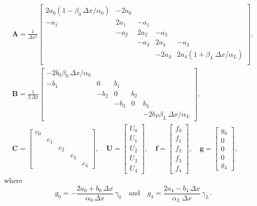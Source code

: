 \begin{gather*}
\boldsymbol{A}=\frac{1}{\Delta x^2}\begin{bmatrix}
2a_0(1-\beta_0\,\Delta x/\alpha_0)&-2a_0&    &    &    \\
-a_1&2a_1&-a_1&    &    \\
    &-a_2&2a_2&-a_2&    \\
    &    &-a_3&2a_3&-a_3\\
    &    &    &-2a_4&2a_4(1+\beta_L\,\Delta x/\alpha_L)\\
               \end{bmatrix},\\
\boldsymbol{B}=\frac{1}{2\,\Delta x}\begin{bmatrix}
-2b_0\beta_0\,\Delta x/\alpha_0&    &    &    &    \\
-b_1&   0& b_1&    &    \\
    &-b_2&   0& b_2&    \\
    &    &-b_3&   0& b_3\\
    &    &    &    &-2b_P\beta_L\,\Delta x/\alpha_L\end{bmatrix},\\
\boldsymbol{C}=\begin{bmatrix}
c_0&   &   &   &   \\
   &c_1&   &   &   \\
   &   &c_2&   &   \\
   &   &   &c_3&   \\
   &   &   &   &c_4
\end{bmatrix},\quad
\boldsymbol{U}=\begin{bmatrix} U_0\\ U_1\\ U_2\\ U_3\\ U_4\end{bmatrix},\quad
\boldsymbol{f}=\begin{bmatrix} f_0\\ f_1\\ f_2\\ f_3\\ f_4\end{bmatrix},\quad
\boldsymbol{g}=\begin{bmatrix} g_0\\ 0\\ 0\\ 0\\ g_4 \end{bmatrix},
\end{gather*}
where
\[
g_0=-\frac{2a_0+b_0\,\Delta x}{\alpha_0\,\Delta x}\,\gamma_0
\quad\text{and}\quad
g_4=\frac{2a_4-b_4\,\Delta x}{\alpha_L\,\Delta x}\,\gamma_L.
\]

